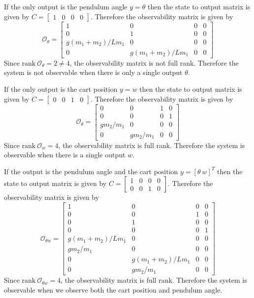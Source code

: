 \documentclass[12pt]{article}
\numberwithin{equation}{section}
\newcommand{\cO}{\mathcal{O}}
\begin{document}
If the only output is the pendulum angle $y = \theta$ then the state to output matrix is given by
$C =
\begin{bmatrix}
    1 & 0 & 0 & 0
\end{bmatrix}$. Therefore the observability matrix is given by
\begin{equation}
    \cO_{\theta}
    =
    \begin{bmatrix}
        1 & 0 & 0 & 0\\
        0 & 1 & 0 & 0\\
        g (m_1 + m_2) / L m_1 & 0 & 0 & 0\\
        0 & g (m_1 + m_2) / L m_1 & 0 & 0
    \end{bmatrix}
\end{equation}
Since $\text{rank}\ \cO_\theta = 2 \neq 4$, the observability matrix is not full rank. Therefore the system is not observable when there is only a single output $\theta$.

If the only output is the cart position $y = w$ then the state to output matrix is given by
$C =
\begin{bmatrix}
    0 & 0 & 1 & 0
\end{bmatrix}$. Therefore the observability matrix is given by
\begin{equation}
    \cO_{\theta}
    =
    \begin{bmatrix}
        0 & 0 & 1 & 0\\
        0 & 0 & 0 & 1\\
        g m_2 / m_1 & 0 & 0 & 0\\
        0 & g m_2 / m_1 & 0 & 0
    \end{bmatrix}
\end{equation}
Since $\text{rank}\ \cO_w = 4$, the observability matrix is full rank. Therefore the system is observable when there is a single output $w$.

If the output is the pendulum angle and the cart position $y = [\theta\ w]^T$ then the state to output matrix is given by
$C =
\begin{bmatrix}
    1 & 0 & 0 & 0\\
    0 & 0 & 1 & 0
\end{bmatrix}$. Therefore the observability matrix is given by
\begin{equation}
    \cO_{\theta w}
    =
    \begin{bmatrix}
        1 & 0 & 0 & 0\\
        0 & 0 & 1 & 0\\
        0 & 1 & 0 & 0\\
        0 & 0 & 0 & 1\\
        g (m_1 + m_2) / L m_1 & 0 & 0 & 0\\
        g m_2 / m_1 & 0 & 0 & 0\\
        0 & g (m_1 + m_2) / L m_1 & 0 & 0\\
        0 & g m_2 / m_1 & 0 & 0
    \end{bmatrix}
\end{equation}
Since $\text{rank}\ \cO_{\theta w} = 4$, the observability matrix is full rank. Therefore the system is observable when we observe both the cart position and pendulum angle.
\end{document}
